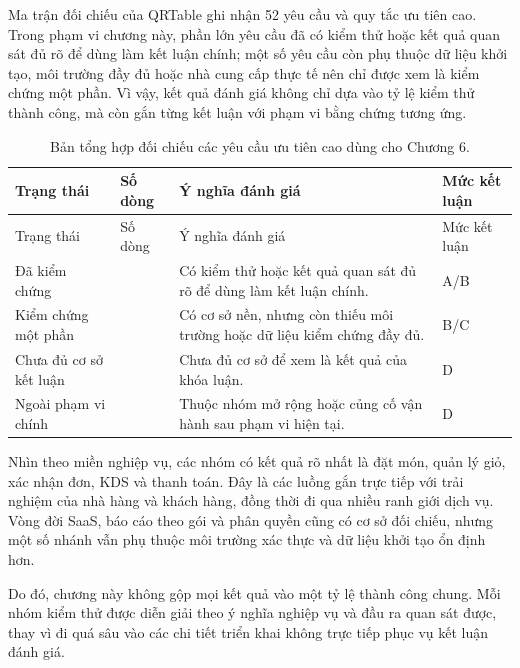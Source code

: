 Ma trận đối chiếu của QRTable ghi nhận 52 yêu cầu và quy tắc ưu tiên cao. Trong phạm vi chương này, phần lớn yêu cầu đã có kiểm thử hoặc kết quả quan sát đủ rõ để dùng làm kết luận chính; một số yêu cầu còn phụ thuộc dữ liệu khởi tạo, môi trường đầy đủ hoặc nhà cung cấp thực tế nên chỉ được xem là kiểm chứng một phần. Vì vậy, kết quả đánh giá không chỉ dựa vào tỷ lệ kiểm thử thành công, mà còn gắn từng kết luận với phạm vi bằng chứng tương ứng.

{\scriptsize\sloppy
\setlength{\tabcolsep}{3pt}
\begin{longtable}{>{\raggedright\arraybackslash}p{}>{\centering\arraybackslash}p{}>{\raggedright\arraybackslash}p{}>{\raggedright\arraybackslash}p{}}
  \caption{Bản tổng hợp đối chiếu các yêu cầu ưu tiên cao dùng cho Chương 6.}
  \label{tab:chapter6-traceability-summary}\\
  \toprule
  Trạng thái & Số dòng & Ý nghĩa đánh giá & Mức kết luận \\
  \midrule
  \endfirsthead
  \toprule
  Trạng thái & Số dòng & Ý nghĩa đánh giá & Mức kết luận \\
  \midrule
  \endhead
  \bottomrule
  \endfoot
  Đã kiểm chứng & 38 & Có kiểm thử hoặc kết quả quan sát đủ rõ để dùng làm kết luận chính. & A/B \\
  Kiểm chứng một phần & 9 & Có cơ sở nền, nhưng còn thiếu môi trường hoặc dữ liệu kiểm chứng đầy đủ. & B/C \\
  Chưa đủ cơ sở kết luận & 1 & Chưa đủ cơ sở để xem là kết quả của khóa luận. & D \\
  Ngoài phạm vi chính & 4 & Thuộc nhóm mở rộng hoặc củng cố vận hành sau phạm vi hiện tại. & D \\
\end{longtable}
}

Nhìn theo miền nghiệp vụ, các nhóm có kết quả rõ nhất là đặt món, quản lý giỏ, xác nhận đơn, KDS và thanh toán. Đây là các luồng gắn trực tiếp với trải nghiệm của nhà hàng và khách hàng, đồng thời đi qua nhiều ranh giới dịch vụ. Vòng đời SaaS, báo cáo theo gói và phân quyền cũng có cơ sở đối chiếu, nhưng một số nhánh vẫn phụ thuộc môi trường xác thực và dữ liệu khởi tạo ổn định hơn.

Do đó, chương này không gộp mọi kết quả vào một tỷ lệ thành công chung. Mỗi nhóm kiểm thử được diễn giải theo ý nghĩa nghiệp vụ và đầu ra quan sát được, thay vì đi quá sâu vào các chi tiết triển khai không trực tiếp phục vụ kết luận đánh giá.


